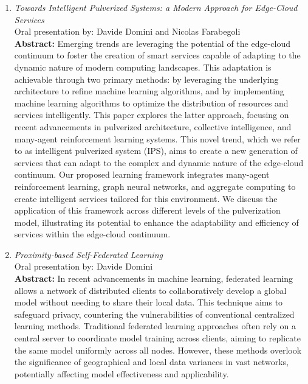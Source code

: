\documentclass[runningheads]{llncs}
\begin{document}
\begin{enumerate}
    \item \emph{Towards Intelligent Pulverized Systems: a Modern Approach for Edge-Cloud Services}~\cite{DBLP:conf/woa/DominiFAV24} \\ Oral presentation by: Davide Domini and Nicolas Farabegoli \\
    \textbf{Abstract: }
    Emerging trends are leveraging the potential of the edge-cloud continuum to foster the creation of smart services capable of adapting to the 
     dynamic nature of modern computing landscapes. 
     This adaptation is achievable through two primary methods: by leveraging the underlying architecture to refine machine learning algorithms, 
      and by implementing machine learning algorithms to optimize the distribution of resources and services intelligently. 
    This paper explores the latter approach, focusing on recent advancements in pulverized architecture, collective intelligence, and many-agent 
     reinforcement learning systems. 
    This novel trend, which we refer to as intelligent pulverized system (IPS), aims to create a new generation of services that can adapt to the 
     complex and dynamic nature of the edge-cloud continuum. Our proposed learning framework integrates many-agent reinforcement learning, graph neural 
     networks, and aggregate computing to create intelligent services tailored for this environment. 
    We discuss the application of this framework across different levels of the pulverization model, illustrating its potential to enhance 
     the adaptability and efficiency of services within the edge-cloud continuum.
    \item \emph{Proximity-based Self-Federated Learning}~\cite{DBLP:conf/acsos/DominiFAVE24} \\ Oral presentation by: Davide Domini \\
    \textbf{Abstract: }
    In recent advancements in machine learning, federated learning allows a network of distributed clients to collaboratively develop a global model 
     without needing to share their local data. 
    This technique aims to safeguard privacy, countering the vulnerabilities of conventional centralized learning methods. 
    Traditional federated learning approaches often rely on a central server to coordinate model training across clients, aiming to replicate 
     the same model uniformly across all nodes. 
    However, these methods overlook the significance of geographical and local data variances in vast networks, potentially affecting model 
     effectiveness and applicability. 

\end{enumerate}
\end{document}
